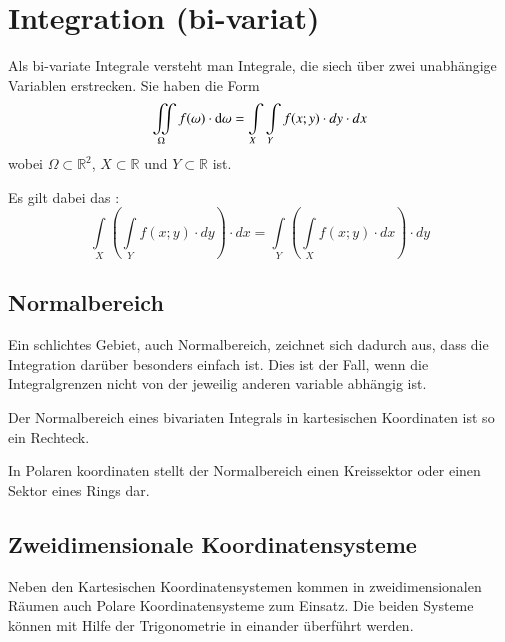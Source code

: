 \newpage
\section{Integration (bi-variat)}
Als bi-variate Integrale versteht man Integrale, die siech über zwei unabhängige Variablen erstrecken.
Sie haben die Form
\[
    \iint\limits_{\Omega} f(\omega)\cdot \mathop{} \! \mathrm{d} \omega =\int\limits_{X} \int\limits_{Y} f(x;y) \cdot dy \cdot dx
\]
wobei $ \Omega \subset \mathbb{R}^2 $, $ X \subset \mathbb{R} $ und $ Y \subset \mathbb{R} $ ist.

Es gilt dabei das :
\[
    \int\limits_{X} \left( \int\limits_{Y} f(x;y) \cdot dy \right) \cdot dx = \int\limits_{Y} \left( \int\limits_{X} f(x;y) \cdot dx \right) \cdot dy
\]

\subsection{Normalbereich}
Ein schlichtes Gebiet, auch Normalbereich, zeichnet sich dadurch aus, dass die Integration darüber besonders einfach ist.
Dies ist der Fall, wenn die Integralgrenzen nicht von der jeweilig anderen variable abhängig ist.

Der Normalbereich eines bivariaten Integrals in kartesischen Koordinaten ist so ein Rechteck. 

In Polaren koordinaten stellt der Normalbereich einen Kreissektor oder einen Sektor eines Rings dar. 

\subsection{Zweidimensionale Koordinatensysteme}
Neben den Kartesischen Koordinatensystemen kommen in zweidimensionalen Räumen auch Polare Koordinatensysteme zum Einsatz.
Die beiden Systeme können mit Hilfe der Trigonometrie in einander überführt werden.


